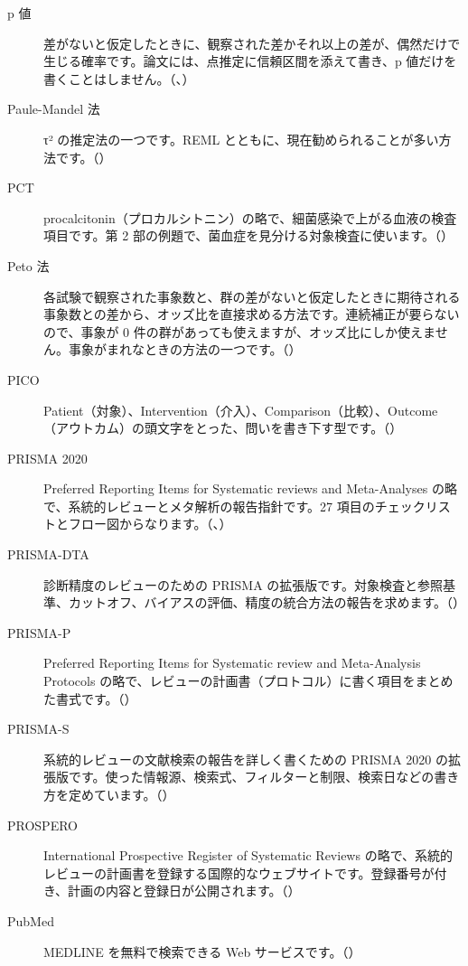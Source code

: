\begin{description}
\item[p 値] 差がないと仮定したときに、観察された差かそれ以上の差が、偶然だけで生じる確率です。論文には、点推定に信頼区間を添えて書き、p 値だけを書くことはしません。（、）
\item[Paule-Mandel 法] τ² の推定法の一つです。REML とともに、現在勧められることが多い方法です。（）
\item[PCT] procalcitonin（プロカルシトニン）の略で、細菌感染で上がる血液の検査項目です。第 2 部の例題で、菌血症を見分ける対象検査に使います。（）
\item[Peto 法] 各試験で観察された事象数と、群の差がないと仮定したときに期待される事象数との差から、オッズ比を直接求める方法です。連続補正が要らないので、事象が 0 件の群があっても使えますが、オッズ比にしか使えません。事象がまれなときの方法の一つです。（）
\item[PICO] Patient（対象）、Intervention（介入）、Comparison（比較）、Outcome（アウトカム）の頭文字をとった、問いを書き下す型です。（）
\item[PRISMA 2020] Preferred Reporting Items for Systematic reviews and Meta-Analyses の略で、系統的レビューとメタ解析の報告指針です。27 項目のチェックリストとフロー図からなります。（、）
\item[PRISMA-DTA] 診断精度のレビューのための PRISMA の拡張版です。対象検査と参照基準、カットオフ、バイアスの評価、精度の統合方法の報告を求めます。（）
\item[PRISMA-P] Preferred Reporting Items for Systematic review and Meta-Analysis Protocols の略で、レビューの計画書（プロトコル）に書く項目をまとめた書式です。（）
\item[PRISMA-S] 系統的レビューの文献検索の報告を詳しく書くための PRISMA 2020 の拡張版です。使った情報源、検索式、フィルターと制限、検索日などの書き方を定めています。（）
\item[PROSPERO] International Prospective Register of Systematic Reviews の略で、系統的レビューの計画書を登録する国際的なウェブサイトです。登録番号が付き、計画の内容と登録日が公開されます。（）
\item[PubMed] MEDLINE を無料で検索できる Web サービスです。（）
\end{description}

